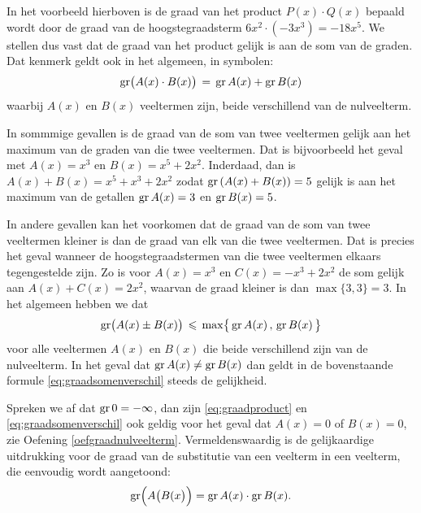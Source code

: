 \documentclass{ximera}
\begin{document}
In het voorbeeld hierboven is de graad van het product $P(x) \cdot Q(x)$ bepaald wordt door de graad van de hoogstegraadsterm $6x^2 \cdot (-3x^3) = -18 x^{5}$. We stellen dus vast dat de graad van het product gelijk is aan de som van de graden. Dat kenmerk geldt ook in het algemeen, in symbolen: 
\begin{equation} \label{eq:graadproduct}
\operatorname{gr}\bigl( A(x) \cdot B(x) \bigr) \, = \, \operatorname{gr} A(x) + \operatorname{gr} B(x)
\end{equation}
waarbij $A(x)$ en $B(x)$ veeltermen zijn, beide verschillend van de nulveelterm. 

In sommmige gevallen is de graad van de som van twee veeltermen gelijk aan het maximum van de graden van die twee veeltermen. Dat is bijvoorbeeld het geval met 
$A(x) = x^3$ en $B(x) = x^5 + 2x^2$. Inderdaad, dan is $A(x) + B(x) = x^5 + x^3 + 2x^2$ zodat $\operatorname{gr}\left(A(x) + B(x)\right) = 5$ gelijk is aan het maximum van de getallen $\operatorname{gr} A(x) = 3$ en $\operatorname{gr} B(x) = 5$. %

In andere gevallen kan het voorkomen dat de graad van de som van twee veeltermen kleiner is dan de graad van elk van die twee veeltermen. Dat is precies het geval wanneer de hoogste\-graadstermen van die twee veeltermen elkaars tegengestelde zijn. Zo is voor $A(x) = x^3$ en $C(x) = -x^3 + 2x^2$ de som gelijk aan $A(x) + C(x) = 2x^2$, waarvan de graad kleiner is dan $\max\{3,3\} = 3$. In het algemeen hebben we dat  
\begin{equation} \label{eq:graadsomenverschil}
\operatorname{gr}\bigl( A(x) \pm B(x) \bigr) \, \leqslant \, \max \bigl\{ \,\operatorname{gr} A(x)\, , \, \operatorname{gr} B(x) \, \bigr\}
\end{equation}
voor alle veeltermen $A(x)$ en $B(x)$ die beide verschillend zijn van de nulveelterm. In het geval dat $\operatorname{gr} A(x) \neq \operatorname{gr} B(x)$ dan geldt in de bovenstaande formule \eqref{eq:graadsomenverschil} steeds de gelijkheid. 

\begin{Uitbreiding}
Spreken we af dat $\operatorname{gr} 0 = - \infty$, dan zijn \eqref{eq:graadproduct} en \eqref{eq:graadsomenverschil} ook geldig voor het geval dat $A(x) = 0$ of $B(x) = 0$, zie Oefening \ref{oefgraadnulveelterm}. Vermeldenswaardig is de gelijkaardige uitdrukking voor de graad van de substitutie van een veelterm in een veelterm, die eenvoudig wordt aangetoond:
\[
\operatorname{gr}\Bigl(A\bigl(B(x\bigr)\Bigr) = \operatorname{gr} A(x) \cdot \operatorname{gr} B(x).
\]
\end{Uitbreiding}
\end{document}

